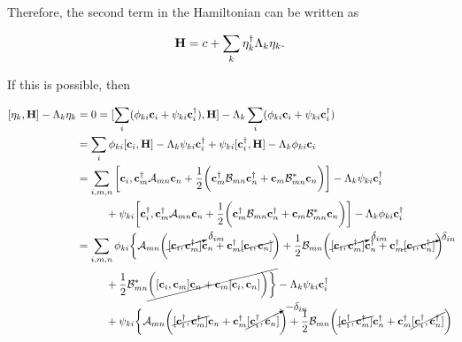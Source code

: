 \documentclass{homework}
\begin{document}
Therefore, the second term in the Hamiltonian can be written as 

\begin{equation}
    {\bf H} = c + \sum_{k} \eta_k^\dagger \Lambda_k \eta_k.
\end{equation}

If this is possible, then 

\begin{equation}
\begin{split}
    [\eta_k, {\bf H}] - \Lambda_k \eta_k &= 0 = [\sum_{i} (\phi_{ki} {\bf c}_i + \psi_{ki} {\bf c}_i^\dagger), {\bf H}] - \Lambda_k \sum_{i} (\phi_{ki} {\bf c}_i + \psi_{ki} {\bf c}_i^\dagger) \\
    &= \sum_{i} \phi_{ki} [{\bf c}_i, {\bf H}] - \Lambda_k \psi_{ki} {\bf c}_i^\dagger + \psi_{ki} [{\bf c}_i^\dagger, {\bf H}] - \Lambda_k \phi_{ki} {\bf c}_i \\
    &= \sum_{i, m, n} \bigg[{\bf c}_i, {\bf c}_m^\dagger \mathcal{A}_{mn} {\bf c}_n + \frac{1}{2} \bigg({\bf c}_m^\dagger \mathcal{B}_{mn} {\bf c}_n^\dagger + {\bf c}_m \mathcal{B}_{mn}^{*} {\bf c}_n \bigg) \bigg] - \Lambda_k \psi_{ki} {\bf c}_i^\dagger \\
    & \blanky \blanky \blanky \blanky \blanky \blanky \blanky \blanky + \psi_{ki}\bigg[{\bf c}_i^\dagger, {\bf c}_m^\dagger \mathcal{A}_{mn} {\bf c}_n + \frac{1}{2} \bigg({\bf c}_m^\dagger \mathcal{B}_{mn} {\bf c}_n^\dagger + {\bf c}_m \mathcal{B}_{mn}^{*} {\bf c}_n \bigg) \bigg] - \Lambda_k \phi_{ki} {\bf c}_i^\dagger \\
    &= \sum_{i, m, n} \phi_{ki} \bigg\{\mathcal{A}_{mn}\bigg(\cancelto{\delta_{im}}{[{\bf c}_i, {\bf c}_m^\dagger]} {\bf c}_n + {\bf c}_m^\dagger \cancel{[{\bf c}_i, {\bf c}_n]}\bigg) + \frac{1}{2} \mathcal{B}_{mn} \bigg(\cancelto{\delta_{im}}{[{\bf c}_i, {\bf c}_m^\dagger]} {\bf c}_n^\dagger + {\bf c}_m^\dagger \cancelto{\delta_{in}}{[{\bf c}_i, {\bf c}_n^\dagger]}\bigg) \\
    & \blanky \blanky \blanky \blanky \blanky \blanky \blanky \blanky + \frac{1}{2} \mathcal{B}_{mn}^{*} \cancel{\bigg([{\bf c}_i, {\bf c}_m] {\bf c}_n + {\bf c}_m [{\bf c}_i, {\bf c}_n]\bigg) \bigg\}} - \Lambda_k \psi_{ki} {\bf c}_i^\dagger \\
    & \blanky \blanky \blanky \blanky \blanky \blanky \blanky \blanky + \psi_{ki} \bigg\{\mathcal{A}_{mn}\bigg(\cancel{[{\bf c}_i^\dagger, {\bf c}_m^\dagger]} {\bf c}_n + {\bf c}_m^\dagger \cancelto{-\delta_{in}}{[{\bf c}_i^\dagger, {\bf c}_n]}\bigg) + \frac{1}{2} \mathcal{B}_{mn} \bigg(\cancel{[{\bf c}_i^\dagger, {\bf c}_m^\dagger]} {\bf c}_n^\dagger + {\bf c}_m^\dagger \cancel{[{\bf c}_i^\dagger, {\bf c}_n^\dagger]}\bigg) \\

\end{split}
\end{equation}
\end{document}
